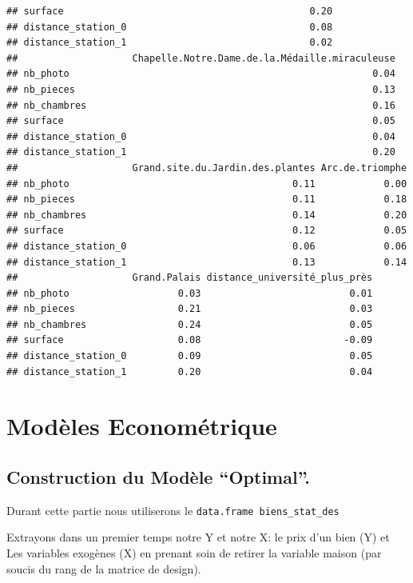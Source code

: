 \documentclass[french,]{article}
\begin{document}
\begin{verbatim}
## surface                                           0.20
## distance_station_0                                0.08
## distance_station_1                                0.02
##                    Chapelle.Notre.Dame.de.la.Médaille.miraculeuse
## nb_photo                                                     0.04
## nb_pieces                                                    0.13
## nb_chambres                                                  0.16
## surface                                                      0.05
## distance_station_0                                           0.04
## distance_station_1                                           0.20
##                    Grand.site.du.Jardin.des.plantes Arc.de.triomphe
## nb_photo                                       0.11            0.00
## nb_pieces                                      0.11            0.18
## nb_chambres                                    0.14            0.20
## surface                                        0.12            0.05
## distance_station_0                             0.06            0.06
## distance_station_1                             0.13            0.14
##                    Grand.Palais distance_université_plus_près
## nb_photo                   0.03                          0.01
## nb_pieces                  0.21                          0.03
## nb_chambres                0.24                          0.05
## surface                    0.08                         -0.09
## distance_station_0         0.09                          0.05
## distance_station_1         0.20                          0.04
\end{verbatim}

\hypertarget{moduxe8les-economuxe9trique}{%
\section{Modèles Econométrique}\label{moduxe8les-economuxe9trique}}

\hypertarget{construction-du-moduxe8le-optimal.}{%
\subsection{Construction du Modèle
``Optimal''.}\label{construction-du-moduxe8le-optimal.}}

Durant cette partie nous utiliserons le
\texttt{data.frame\ biens\_stat\_des}

Extrayons dans un premier temps notre Y et notre X: le prix d'un bien
(Y) et Les variables exogènes (X) en prenant soin de retirer la variable
maison (par soucis du rang de la matrice de design).
\end{document}
